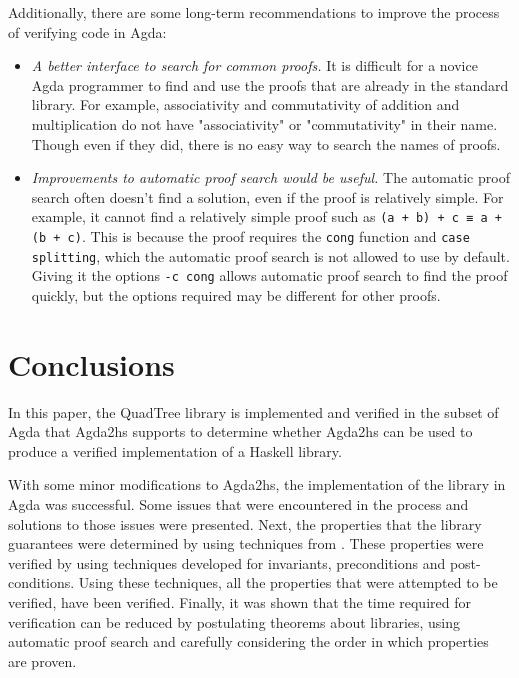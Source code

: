Additionally, there are some long-term recommendations to improve the process of verifying code in Agda:
\begin{itemize}
	\item \textit{A better interface to search for common proofs.} It is difficult for a novice Agda programmer to find and use the proofs that are already in the standard library. For example, associativity and commutativity of addition and multiplication do not have "associativity" or "commutativity" in their name. Though even if they did, there is no easy way to search the names of proofs.
	\item \textit{Improvements to automatic proof search would be useful.} The automatic proof search often doesn't find a solution, even if the proof is relatively simple. For example, it cannot find a relatively simple proof such as \verb|(a + b) + c ≡ a + (b + c)|. This is because the proof requires the \verb|cong| function and \verb|case splitting|, which the automatic proof search is not allowed to use by default. Giving it the options \verb|-c cong| allows automatic proof search to find the proof quickly, but the options required may be different for other proofs.
\end{itemize}

\section{Conclusions}
In this paper, the QuadTree library is implemented and verified in the subset of Agda that Agda2hs supports to determine whether Agda2hs can be used to produce a verified implementation of a Haskell library. 

With some minor modifications to Agda2hs, the implementation of the library in Agda was successful. Some issues that were encountered in the process and solutions to those issues were presented. Next, the properties that the library guarantees were determined by using techniques from \cite{BREITNER2021}. These properties were verified by using techniques developed for invariants, preconditions and post-conditions.  Using these techniques, all the properties that were attempted to be verified, have been verified. Finally, it was shown that the time required for verification can be reduced by postulating theorems about libraries, using automatic proof search and carefully considering the order in which properties are proven.

